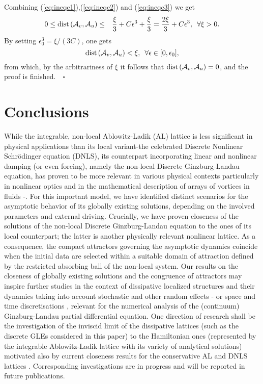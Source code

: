 \documentclass[preprintnumbers,amsmath,amssymb]{revtex4}
\begin{document}
 Combining (\ref{eq:ineqc1}),(\ref{eq:ineqc2}) and (\ref{eq:ineqc3})
we get 
\begin{eqnarray}
  0\le {\rm dist}\left({\cal A}_v,{\cal A}_u\right)&\le& 
  \frac{\xi}{3}+C\epsilon^3+\frac{\xi}{3}=\frac{2\xi}{3}+C\epsilon^3,\,\,\,\forall \xi>0.
\end{eqnarray}
By setting $\epsilon_0^3=\xi/(3C)$, one gets 
\begin{equation}
 {\rm dist}\left({\cal A}_v,{\cal A}_u\right)< \xi,\,\,\,\forall \epsilon\in [0,\epsilon_0],  
\end{equation}
from which, by the arbitrariness of $\xi$ it follows that 
${\rm dist}\left({\cal A}_v,{\cal A}_u\right)=0$,
and the proof is finished.\ \ $\square$



\section{Conclusions}
\label{SecCon}
While the integrable, non-local Ablowitz-Ladik (AL) lattice \cite{Ablowitz} is less significant in physical applications than its local variant-the  celebrated Discrete Nonlinear Schr\"odinger equation (DNLS), its counterpart incorporating linear and nonlinear damping (or even forcing), namely the non-local Discrete Ginzburg-Landau equation, has proven to be more relevant in various physical contexts particularly in nonlinear optics \cite{AchBook} and  in the mathematical description of arrays of vortices in fluids \cite{AGL1}-\cite{AGL2}.  For this important model, we have identified distinct scenarios for the asymptotic behavior of its globally existing solutions, depending on the involved parameters and external driving. 
Crucially, we have proven closeness of the  solutions of the non-local Discrete Ginzburg-Landau equation to the ones of its local counterpart; the latter  is another physically relevant nonlinear lattice. As a consequence, the compact attractors governing the asymptotic dynamics coincide when the initial data are selected within a suitable domain of attraction defined by the restricted absorbing ball of the non-local system.  
Our results on the  closeness of globally existing solutions and the congruence of attractors may inspire further studies in the context of dissipative localized structures and their dynamics taking into account stochastic and other random effects \cite{Stoch1}-\cite{Stoch4} or  space and time discretisations \cite{GLord},\cite{Han} relevant for the  numerical analysis of the (continuum) Ginzburg-Landau partial differential equation. 
One direction of research shall be the investigation of the inviscid limit \cite{Zhao} of the dissipative lattices (such as the discrete GLEs considered in this paper) to the Hamiltonian ones (represented by the integrable Ablowitz-Ladik lattice with its variety of analytical solutions)  motivated also by current closeness results for the conservative AL and DNLS lattices \cite{DNJ2021}. Corresponding investigations are in progress and will be reported in future publications. 
\end{document}
